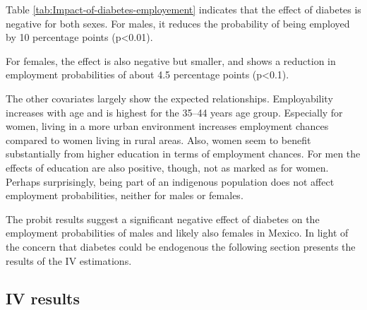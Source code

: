 \begin{table}[p]
\begin{center}
\begin{adjustbox}{max width=\textwidth, center}
\begin{threeparttable}
 &     8243         &         \\ \bottomrule {} \\ \\ \end{tabular}
}
\end{threeparttable}
\end{adjustbox}
\end{center}
\end{table}

Table \ref{tab:Impact-of-diabetes-employement} indicates
that the effect of diabetes is negative for both sexes. For males,
it reduces the probability of being employed by 10 percentage points
(p<0.01).


For females, the effect is also negative but smaller, and
shows a reduction in employment probabilities of about 4.5 percentage
points (p<0.1).




The other covariates largely show the expected relationships.
Employability increases with age and is highest for the 35--44 years
age group. Especially for women, living in a more urban environment
increases employment chances compared to women living in rural areas.
Also, women seem to benefit substantially from higher education in
terms of employment chances. For men the effects of education are
also positive, though, not as marked as for women. Perhaps surprisingly,
being part of an indigenous population does not affect employment
probabilities, neither for males or females. 

The probit results suggest a significant negative effect
of diabetes on the employment probabilities of males and likely also
females in Mexico. In light of the concern that diabetes could be
endogenous the following section presents the results of the \ac{IV}
estimations. 
\FloatBarrier

\subsection{\label{sub:Bivariate-probit}IV results}


